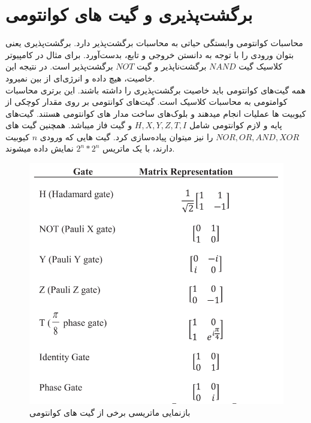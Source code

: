 \section{برگشت‌پذیری و گیت های کوانتومی}
محاسبات کوانتومی وابستگی حیاتی به محاسبات برگشت‌پذیر
 دارد. برگشت‌پذیری یعنی بتوان ورودی را با توجه به دانستن خروجی و تابع، بدست‌آورد. برای مثال در کامپیوتر کلاسیک گیت‌ $NAND$ برگشت‌ناپذیر و گیت $NOT$ برگشت‌پذیر است. در نتیجه این خاصیت، هیچ داده و انرژی‌ای از بین نمیرود.
\\
همه گیت‌های کوانتومی باید خاصیت برگشت‌پذیری را داشته باشند. این برتری محاسبات کوامتومی به محاسبات کلاسیک است. گیت‌های کوانتومی بر روی مقدار کوچکی از کیوبیت ها عملیات انجام میدهند و بلوک‌های ساخت مدار های کوانتومی هستند. گیت‌های پایه و لازم کوانتومی شامل $H, X, Y, Z, T, I$ و گیت فاز
میباشد. همچنین گیت های $NOR, OR, AND, XOR$ را نیز میتوان پیاده‌سازی کرد. گیت هایی که ورودی $n$ کیوبیت دارند، با یک ماتریس $2^{n} * 2^{n}$ نمایش داده میشوند.
\cite{fundamentalsandapplications}
\begin{figure}[!h]
\centerline{\includegraphics[width=.7\textwidth]{gates.png}}
\caption{بازنمایی ماتریسی برخی از گیت های کوانتومی}
\end{figure}